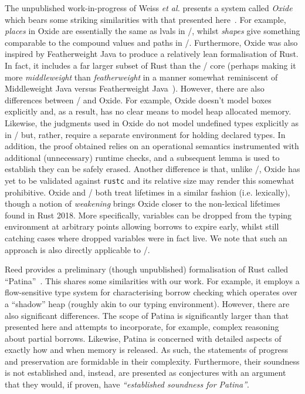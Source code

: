The unpublished work-in-progress of Weiss {\em et al.} presents a
system called {\em Oxide} which bears some striking similarities with
that presented here~\cite{WPMA19}.  For example, {\em places} in Oxide
are essentially the same as lvals in \FR/, whilst {\em shapes} give
something comparable to the compound values and paths in \FR/.
Furthermore, Oxide was also inspired by Featherweight Java to produce
a relatively lean formalisation of Rust.  In fact, it includes a far
larger subset of Rust than the \FR/ core (perhaps making it more {\em
  middleweight} than {\em featherweight} in a manner somewhat
reminiscent of Middleweight Java versus Featherweight
Java~\cite{BP03}).  However, there are also differences between \FR/
and Oxide.  For example, Oxide doesn't model boxes explicitly and, as
a result, has no clear means to model heap allocated memory.
Likewise, the judgments used in Oxide do not model undefined types
explicitly as in \FR/ but, rather, require a separate environment for
holding declared types.  In addition, the proof obtained relies on an
operational semantics instrumented with additional (unnecessary)
runtime checks, and a subsequent lemma is used to establish they can
be safely erased.  Another difference is that, unlike \FR/, Oxide has
yet to be validated against \lstinline{rustc} and its relative size
may render this somewhat prohibitive.  Oxide and \FR/ both treat
lifetimes in a similar fashion (i.e. lexically), though a notion of
{\em weakening} brings Oxide closer to the non-lexical lifetimes found
in Rust 2018.  More specifically, variables can be dropped from the
typing environment at arbitrary points allowing borrows to expire
early, whilst still catching cases where dropped variables were in
fact live.  We note that such an approach is also directly applicable
to \FR/.

Reed provides a preliminary (though unpublished) formalisation of Rust
called ``Patina''~\cite{Reed15}.  This shares some similarities with
our work.  For example, it employs a flow-sensitive type system for
characterising borrow checking which operates over a ``shadow'' heap
(roughly akin to our typing environment).  However, there are also
significant differences.  The scope of Patina is significantly larger
than that presented here and attempts to incorporate, for example,
complex reasoning about partial borrows.  Likewise, Patina is
concerned with detailed aspects of exactly how and when memory is
released.  As such, the statements of progress and preservation are
formidable in their complexity.  Furthermore, their soundness is not
established and, instead, are presented as conjectures with an
argument that they would, if proven, have {\em ``established soundness
  for Patina''}.


